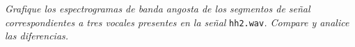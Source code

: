 


\textit{Grafique los espectrogramas de banda angosta de los segmentos de señal correspondientes a
tres vocales presentes en la señal} \texttt{hh2.wav}\textit{. Compare y analice las diferencias.}

